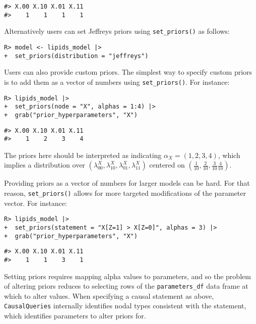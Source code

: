 \documentclass[
  11pt,
  article]{jss}
\begin{document}
\begin{verbatim}
#> X.00 X.10 X.01 X.11 
#>    1    1    1    1
\end{verbatim}

Alternatively users can set Jeffreys priors using \texttt{set\_priors()}
as follows:

\begin{verbatim}
R> model <- lipids_model |> 
+  set_priors(distribution = "jeffreys")
\end{verbatim}

Users can also provide custom priors. The simplest way to specify custom
priors is to add them as a vector of numbers using
\texttt{set\_priors()}. For instance:

\begin{verbatim}
R> lipids_model |> 
+  set_priors(node = "X", alphas = 1:4) |> 
+  grab("prior_hyperparameters", "X")
\end{verbatim}

\begin{verbatim}
#> X.00 X.10 X.01 X.11 
#>    1    2    3    4
\end{verbatim}

The priors here should be interpreted as indicating
\(\alpha_X = (1,2, 3, 4)\), which implies a distribution over
\((\lambda^X_{00},\lambda^X_{10}, \lambda^X_{01}, \lambda^X_{11})\)
centered on
\(\left(\frac1{10}, \frac2{10}, \frac3{10} \frac4{10} \right)\).

Providing priors as a vector of numbers for larger models can be hard.
For that reason, \texttt{set\_priors()} allows for more targeted
modifications of the parameter vector. For instance:

\begin{verbatim}
R> lipids_model |>
+  set_priors(statement = "X[Z=1] > X[Z=0]", alphas = 3) |>
+  grab("prior_hyperparameters", "X")
\end{verbatim}

\begin{verbatim}
#> X.00 X.10 X.01 X.11 
#>    1    1    3    1
\end{verbatim}

Setting priors requires mapping alpha values to parameters, and so the
problem of altering priors reduces to selecting rows of the
\texttt{parameters\_df} data frame at which to alter values. When
specifying a causal statement as above, \texttt{CausalQueries}
internally identifies nodal types consistent with the statement, which
identifies parameters to alter priors for.
\end{document}
